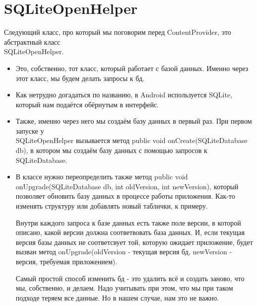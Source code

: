 \documentclass[12 pt]{article}
\begin{document}
\section{SQLiteOpenHelper}	
	Следующий класс, про который мы поговорим перед ContentProvider, это абстрактный класс \\ SQLiteOpenHelper.
	\begin{itemize}
	    \item Это, собственно, тот класс, который работает с базой данных. Именно через этот класс, мы будем делать запросы к бд.
	    \item Как нетрудно догадаться по названию, в Android используется SQLite, который нам подаётся обёрнутым в интерфейс.
	    \item Также, именно через него мы создаём базу данных в первый раз. При первом запуске у \\ SQLiteOpenHelper вызывается метод public void onCreate(SQLiteDatabase db), в котором мы создаём базу данных с помощью запросов к SQLiteDatabase.
	    \item В классе нужно переопределить также метод public void onUpgrade(SQLiteDatabase db, int oldVersion, int newVersion), который позволяет обновить базу данных в процессе работы приложения. Как-то изменять структуру или добавлять новый таблички, к примеру. 
	    
	    Внутри каждого запроса к базе данных есть также поле версии, в которой описано, какой версии должна соответвовать база данных. И, если текущая версия базы данных не соответсвует той, которую ожидает приложение, будет вызван метод onUpgrade(oldVersion - текущая версия бд, newVersion - версия, требуемая приложением).
	    
	    Самый простой способ изменить бд - это удалить всё и создать заново, что мы, собственно, и делаем. Надо учитывать при этом, что мы при таком подходе теряем все данные. Но в нашем случае, нам это не важно.
	\end{itemize}
	
\end{document}
